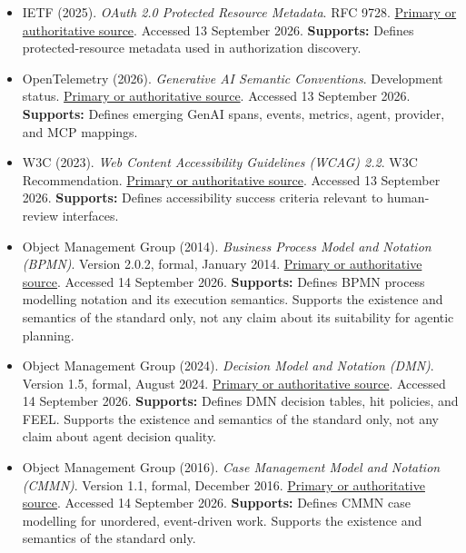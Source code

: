 \begin{itemize}
\item {}\textbf{} IETF (2025). \emph{OAuth 2.0 Protected Resource Metadata}. RFC 9728. \href{\detokenize{https://datatracker.ietf.org/doc/html/rfc9728}}{Primary or authoritative source}. Accessed 13 September 2026. \textbf{Supports:} Defines protected-resource metadata used in authorization discovery.

\item {}\textbf{} OpenTelemetry (2026). \emph{Generative AI Semantic Conventions}. Development status. \href{\detokenize{https://github.com/open-telemetry/semantic-conventions-genai}}{Primary or authoritative source}. Accessed 13 September 2026. \textbf{Supports:} Defines emerging GenAI spans, events, metrics, agent, provider, and MCP mappings.

\item {}\textbf{} W3C (2023). \emph{Web Content Accessibility Guidelines (WCAG) 2.2}. W3C Recommendation. \href{\detokenize{https://www.w3.org/TR/WCAG22/}}{Primary or authoritative source}. Accessed 13 September 2026. \textbf{Supports:} Defines accessibility success criteria relevant to human-review interfaces.

\item {}\textbf{} Object Management Group (2014). \emph{Business Process Model and Notation (BPMN)}. Version 2.0.2, formal, January 2014. \href{\detokenize{https://www.omg.org/spec/BPMN/2.0.2}}{Primary or authoritative source}. Accessed 14 September 2026. \textbf{Supports:} Defines BPMN process modelling notation and its execution semantics. Supports the existence and semantics of the standard only, not any claim about its suitability for agentic planning.

\item {}\textbf{} Object Management Group (2024). \emph{Decision Model and Notation (DMN)}. Version 1.5, formal, August 2024. \href{\detokenize{https://www.omg.org/spec/DMN/1.5}}{Primary or authoritative source}. Accessed 14 September 2026. \textbf{Supports:} Defines DMN decision tables, hit policies, and FEEL. Supports the existence and semantics of the standard only, not any claim about agent decision quality.

\item {}\textbf{} Object Management Group (2016). \emph{Case Management Model and Notation (CMMN)}. Version 1.1, formal, December 2016. \href{\detokenize{https://www.omg.org/spec/CMMN/1.1}}{Primary or authoritative source}. Accessed 14 September 2026. \textbf{Supports:} Defines CMMN case modelling for unordered, event-driven work. Supports the existence and semantics of the standard only.


\end{itemize}
